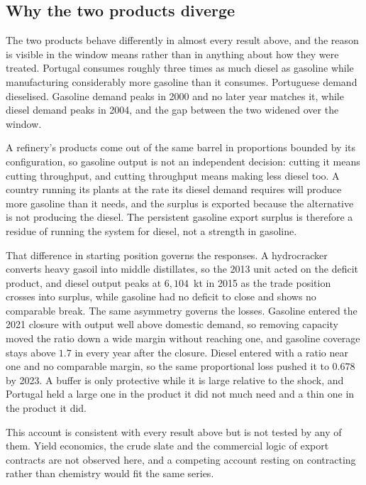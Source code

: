 \documentclass[11pt,a4paper]{article}
\begin{document}
\subsection{Why the two products diverge}

The two products behave differently in almost every result above, and the reason is visible in
the window means rather than in anything about how they were treated. Portugal consumes roughly
three times as much diesel as gasoline while manufacturing considerably more gasoline than it
consumes. Portuguese demand dieselised. Gasoline demand peaks in 2000 and no later year matches
it, while diesel demand peaks in 2004, and the gap between the two widened over the window.

A refinery's products come out of the same barrel in proportions bounded by its configuration, so
gasoline output is not an independent decision: cutting it means cutting throughput, and
cutting throughput means making less diesel too. A country running its plants at the rate its diesel
demand requires will produce more gasoline than it needs, and the surplus is exported because the
alternative is not producing the diesel. The persistent gasoline export surplus is therefore a
residue of running the system for diesel, not a strength in gasoline.

That difference in starting position governs the responses. A hydrocracker converts heavy gasoil
into middle distillates, so the 2013 unit acted on the deficit product, and diesel output
peaks at $6{,}104$~kt in 2015 as the trade position crosses into surplus, while gasoline had no deficit
to close and shows no comparable break. The same asymmetry governs the losses. Gasoline entered
the 2021 closure with output well above domestic demand, so removing capacity moved the ratio
down a wide margin without reaching one, and gasoline coverage stays above $1.7$ in every year
after the closure. Diesel entered with a ratio near one and no comparable margin, so the same
proportional loss pushed it to $0.678$ by 2023. A buffer is only protective while it is large
relative to the shock, and Portugal held a large one in the product it did not much need and a
thin one in the product it did.

This account is consistent with every result above but is not tested by any of them. Yield
economics, the crude slate and the commercial logic of export contracts are not observed here,
and a competing account resting on contracting rather than chemistry would fit the same series.
\end{document}
